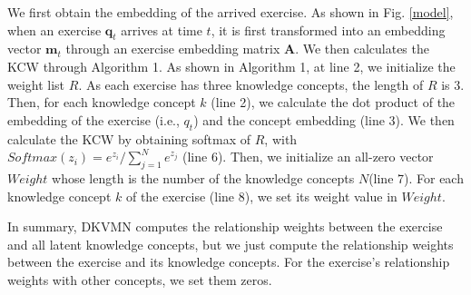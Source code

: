 \documentclass{edm_template}
\begin{document}
We first obtain the embedding of the arrived exercise.
As shown in Fig. \ref{model}, when an exercise $\textbf{q}_t$ arrives at time $t$, it is first transformed into an embedding vector $\textbf{m}_t$ through an exercise embedding matrix $\textbf{A}$. We then calculates the KCW through Algorithm 1. As shown in Algorithm 1,
at line 2, we initialize the weight list $R$. As each exercise has three knowledge concepts, the length of $R$ is 3. Then, for each knowledge concept $k$ (line 2), we calculate the dot product of the embedding of the exercise (i.e., $q_t$) and the concept embedding (line 3). We then calculate the KCW by obtaining softmax of $R$, with $Softmax(z_i)=e^{z_i}/\sum_{j=1}^Ne^{z_j}$ (line 6). Then, we initialize an all-zero vector $Weight$ whose length is the number of the knowledge concepts $N$(line 7). For each knowledge concept $k$ of the exercise (line 8), we set its weight value in $Weight$.

In summary, DKVMN computes the relationship weights between the exercise and all latent knowledge concepts, but we just compute the relationship weights between the exercise and its knowledge concepts. For the exercise's relationship weights with other concepts, we set them zeros.
\end{document}
